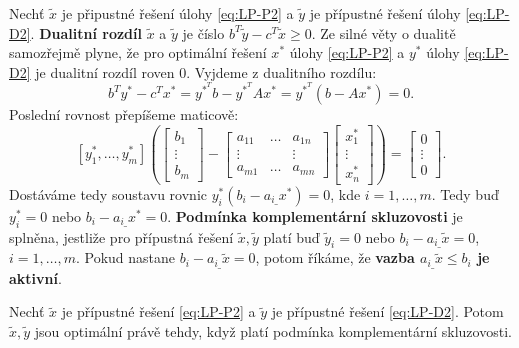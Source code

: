 Nechť $\tilde{x}$ je připustné řešení úlohy \ref{eq:LP-P2} a $\tilde{y}$ je přípustné řešení úlohy \ref{eq:LP-D2}. \textbf{Dualitní rozdíl} $\tilde{x}$ a $\tilde{y}$ je číslo $b^T \tilde{y} - c^T \tilde{x} \geq 0$. Ze silné věty o dualitě samozřejmě plyne, že pro optimální řešení $x^*$ úlohy \ref{eq:LP-P2} a $y^*$ úlohy \ref{eq:LP-D2} je dualitní rozdíl roven $0$. Vyjdeme z dualitního rozdílu:
$$
    b^T y^* - c^T x^* = y^{*^T} b - y^{*^T} A x^* = y^{*^T} \left( b - A x^* \right) = 0.
$$
Poslední rovnost přepíšeme maticově:
$$
    \left[ y_1^*, \dots, y_m^* \right] \left(
        \begin{bmatrix}
            b_1    \\
            \vdots \\
            b_m
        \end{bmatrix}
        -
        \begin{bmatrix}
            a_{11} & \dots & a_{1n} \\
            \vdots & \     & \vdots \\
            a_{m1} & \dots & a_{mn}
        \end{bmatrix}
        \begin{bmatrix}
            x_1^*  \\
            \vdots \\
            x_n^*
        \end{bmatrix}
    \right)
    =
    \begin{bmatrix}
    0      \\
    \vdots \\
    0
    \end{bmatrix}.
$$
Dostáváme tedy soustavu rovnic $y_i^* \left( b_i - a_{i\_} x^* \right) = 0$, kde $i = 1, \dots, m$. Tedy buď $y_i^* = 0$ nebo $ b_i - a_{i\_} x^* = 0$. \textbf{Podmínka komplementární skluzovosti} je splněna, jestliže pro přípustná řešení $\tilde{x}, \tilde{y}$ platí buď $\tilde{y}_i = 0$ nebo $b_i - a_{i\_} \tilde{x} = 0$, $i = 1, \dots, m$. Pokud nastane $b_i - a_{i\_} \tilde{x} = 0$, potom říkáme, že \textbf{vazba $a_{i\_} \tilde{x} \leq b_i$ je aktivní}.

\begin{vt}
    Nechť $\tilde{x}$ je přípustné řešení \ref{eq:LP-P2} a $\tilde{y}$ je přípustné řešení \ref{eq:LP-D2}. Potom $\tilde{x}, \tilde{y}$ jsou optimální právě tehdy, když platí podmínka komplementární skluzovosti.
\end{vt}